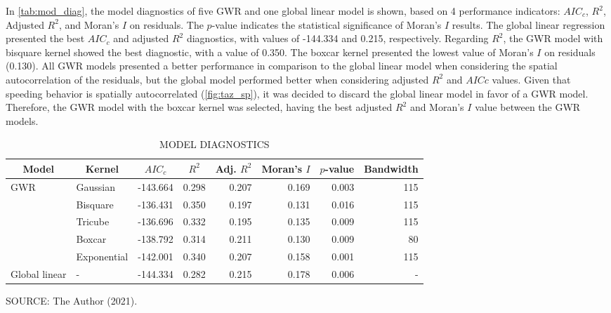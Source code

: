 In \autoref{tab:mod_diag}, the model diagnostics of five GWR and one global linear model is shown, based on 4 performance indicators: $AIC_c$, $R^2$, Adjusted $R^2$, and Moran's $I$ on residuals. The $p$-value indicates the statistical significance of Moran's $I$ results. The global linear regression presented the best $AIC_c$ and adjusted $R^2$ diagnostics, with values of -144.334 and 0.215, respectively. Regarding $R^2$, the GWR model with bisquare kernel showed the best diagnostic, with a value of 0.350. The boxcar kernel presented the lowest value of Moran's $I$ on residuals (0.130). All GWR models presented a better performance in comparison to the global linear model when considering the spatial autocorrelation of the residuals, but the global model performed better when considering adjusted $R^2$ and $AICc$ values. Given that speeding behavior is spatially autocorrelated (\autoref{fig:taz_sp}), it was decided to discard the global linear model in favor of a GWR model. Therefore, the GWR model with the boxcar kernel was selected, having the best adjusted $R^2$ and Moran's $I$ value between the GWR models. 

\begin{table}[!htbp]
    \footnotesize
    \captionsetup{justification=raggedright,
        singlelinecheck=false,
        font=footnotesize}
    \caption{MODEL DIAGNOSTICS}
    \centering
    \begin{tabular}{llrrrrrr}
        \hline
        \multicolumn{1}{c}{\textbf{Model}} & \multicolumn{1}{c}{\textbf{Kernel}} & \multicolumn{1}{c}{\textbf{$AIC_c$}} & \multicolumn{1}{c}{\textbf{$R^2$}} &
        \multicolumn{1}{c}{\textbf{Adj. $R^2$}} & \multicolumn{1}{c}{\textbf{Moran's $I$}} & \multicolumn{1}{c}{\textbf{$p$-value}} & \multicolumn{1}{c}{\textbf{Bandwidth}} \\
        \hline
        GWR & Gaussian    & -143.664 & 0.298 & 0.207 & 0.169 & 0.003 & 115 \\
            & Bisquare    & -136.431 & 0.350 & 0.197 & 0.131 & 0.016 & 115 \\
            & Tricube     & -136.696 & 0.332 & 0.195 & 0.135 & 0.009 & 115 \\
            & Boxcar      & -138.792 & 0.314 & 0.211 & 0.130 & 0.009 &  80 \\
            & Exponential & -142.001 & 0.340 & 0.207 & 0.158 & 0.001 & 115 \\
        Global linear & - & -144.334 & 0.282 & 0.215 & 0.178 & 0.006 & -   \\
        \hline
    \end{tabular}
    \label{tab:mod_diag}
    \par \vspace{2mm} \footnotesize \raggedright
    SOURCE: The Author (2021).
\end{table}

